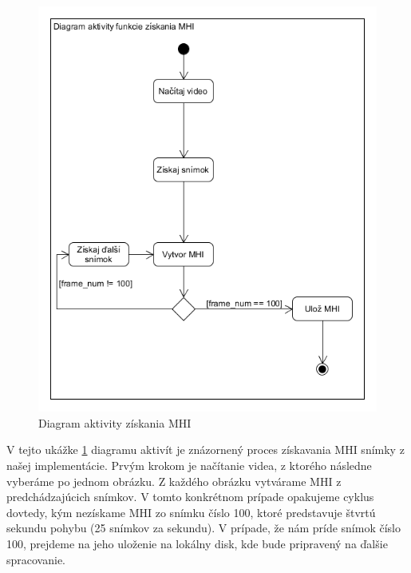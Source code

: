 \begin{figure}[H]
  \centering
  \includegraphics[width=17cm]{img/actMHIsnimok.png}
  \caption{Diagram aktivity získania MHI}
  \label{MHIcreate}
\end{figure}  


V tejto ukážke \ref{MHIcreate} diagramu aktivít je znázornený proces získavania MHI snímky z našej implementácie. Prvým krokom je načítanie videa, z ktorého následne vyberáme po jednom obrázku. Z každého obrázku vytvárame MHI z predchádzajúcich snímkov. V tomto konkrétnom prípade opakujeme cyklus dovtedy, kým nezískame MHI zo snímku číslo 100, ktoré predstavuje štvrtú sekundu pohybu (25 snímkov za sekundu). V prípade, že nám príde snímok číslo 100, prejdeme na jeho uloženie na lokálny disk, kde bude pripravený na ďalšie spracovanie. 


